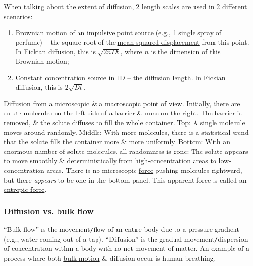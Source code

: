 \documentclass{article}
\begin{document}
When talking about the extent of diffusion, 2 length scales are used in 2 different scenarios:
\begin{enumerate}
	\item \href{https://en.wikipedia.org/wiki/Brownian_motion}{Brownian motion} of an \href{https://en.wikipedia.org/wiki/Impulse_response}{impulsive} point source (e.g., 1 single spray of perfume) -- the square root of the \href{https://en.wikipedia.org/wiki/Mean_squared_displacement}{mean squared displacement} from this point. In Fickian diffusion, this is $\sqrt{2nDt}$, where $n$ is the dimension of this Brownian motion;
	\item \href{https://en.wikipedia.org/wiki/Fick%27s_laws_of_diffusion#Example_solutions_and_generalization}{Constant concentration source} in 1D -- the diffusion length. In Fickian diffusion, this is $2\sqrt{Dt}$.
\end{enumerate}
{\sf Diffusion from a microscopic \& a macroscopic point of view. Initially, there are \href{https://en.wikipedia.org/wiki/Solute}{solute} molecules on the left side of a barrier \& none on the right. The barrier is removed, \& the solute diffuses to fill the whole container. Top: A single molecule moves around randomly. Middle: With more molecules, there is a statistical trend that the solute fills the container more \& more uniformly. Bottom: With an enormous number of solute molecules, all randomness is gone: The solute appears to move smoothly \& deterministically from high-concentration areas to low-concentration areas. There is no microscopic \href{https://en.wikipedia.org/wiki/Force}{force} pushing molecules rightward, but there {\it appears} to be one in the bottom panel. This apparent force is called an \href{https://en.wikipedia.org/wiki/Entropic_force}{entropic force}.}

\subsubsection{Diffusion vs. bulk flow}
``Bulk flow'' is the movement{\tt/}flow of an entire body due to a pressure gradient (e.g., water coming out of a tap). ``Diffusion'' is the gradual movement{\tt/}dispersion of concentration within a body with no net movement of matter. An example of a process where both \href{https://en.wikipedia.org/wiki/Mass_flow_(life_sciences)}{bulk motion} \& diffusion occur is human breathing.
\end{document}
